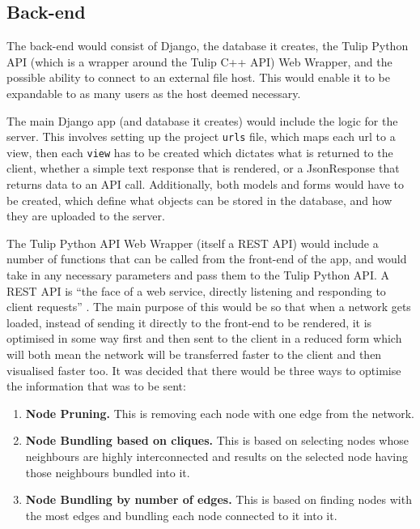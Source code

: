 \documentclass[../dissertation.tex]{subfiles}
\begin{document}
\subsection{Back-end}
\label{sec:overview-backend}

The back-end would consist of Django, the database it creates, the Tulip Python API (which is a wrapper around the Tulip C++ API) Web Wrapper, and the possible ability to connect to an external file host. This would enable it to be expandable to as many users as the host deemed necessary.

The main Django app (and database it creates) would include the logic for the server. This involves setting up the project \texttt{urls} file, which maps each url to a view, then each \texttt{view} has to be created which dictates what is returned to the client, whether a simple text response that is rendered, or a JsonResponse that returns data to an API call. Additionally, both models and forms would have to be created, which define what objects can be stored in the database, and how they are uploaded to the server.

The Tulip Python API Web Wrapper (itself a REST API) would include a number of functions that can be called from the front-end of the app, and would take in any necessary parameters and pass them to the Tulip Python API. A REST API is ``the face of a web service, directly listening and responding to client requests'' \cite{masse2011rest}. The main purpose of this would be so that when a network gets loaded, instead of sending it directly to the front-end to be rendered, it is optimised in some way first and then sent to the client in a reduced form which will both mean the network will be transferred faster to the client and then visualised faster too. It was decided that there would be three ways to optimise the information that was to be sent:
\begin{enumerate}
    \item \textbf{Node Pruning.} This is removing each node with one edge from the network.
    \item \textbf{Node Bundling based on cliques.} This is based on selecting nodes whose neighbours are highly interconnected and results on the selected node having those neighbours bundled into it.
    \item \textbf{Node Bundling by number of edges.} This is based on finding nodes with the most edges and bundling each node connected to it into it.
\end{enumerate}
\end{document}
